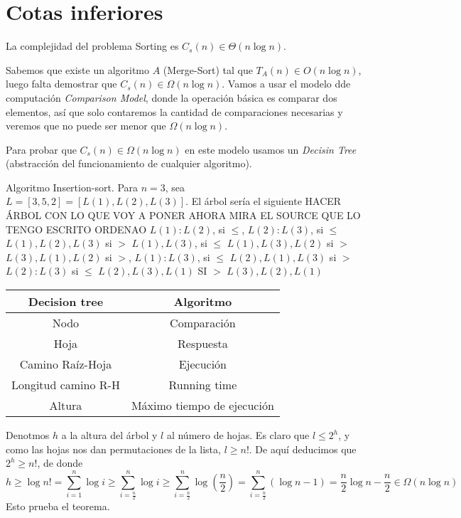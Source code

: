 \documentclass[AL.tex]{subfiles}
\begin{document}
\section{Cotas inferiores}
\begin{teorema}
La complejidad del problema Sorting es $C_s(n)\in\Theta(n\log n)$.
\end{teorema}

Sabemos que existe un algoritmo $A$ (Merge-Sort) tal que $T_A(n)\in O(n\log n)$, luego falta demostrar que $C_s(n)\in\Omega(n\log n)$. Vamos a usar el modelo dde computación \emph{Comparison Model}, donde la operación básica es comparar dos elementos, así que solo contaremos la cantidad de comparaciones necesarias y veremos que no puede ser menor que $\Omega(n\log n)$. 

Para probar que $C_s(n)\in\Omega(n\log n)$ en este modelo usamos un \emph{Decisin Tree} (abstracción del funcionamiento de cualquier algoritmo). 
\begin{ej}
Algoritmo Insertion-sort. Para $n=3$, sea $L=[3,5,2]=[L(1),L(2),L(3)]$. El árbol sería el siguiente
HACER ÁRBOL CON LO QUE VOY A PONER AHORA MIRA EL SOURCE QUE LO TENGO ESCRITO ORDENAO
$L(1):L(2)$, si $\leq$, $L(2):L(3)$, si $\leq$ $L(1),L(2),L(3)$
                                     si $>$ $L(1),L(3)$,        si $\leq$ $L(1),L(3),L(2)$
                                                                si $>$ $L(3),L(1),L(2)$
             si $>$, $L(1):L(3)$, si $\leq$ $L(2),L(1),L(3)$ 
                                     si $>$ $L(2):L(3)$         si $\leq$ $L(2),L(3),L(1)$
             													SI $>$ $L(3),L(2),L(1)$
\end{ej}
\begin{center}
\begin{tabular}{c|c}
Decision tree & Algoritmo\\
\hline
Nodo & Comparación\\
Hoja & Respuesta\\
Camino Raíz-Hoja & Ejecución\\
Longitud camino R-H & Running time\\
Altura & Máximo tiempo de ejecución
\end{tabular}
\end{center}

Denotmos $h$ a la altura del árbol y $l$ al número de hojas. Es claro que $l\leq 2^h$, y como las hojas nos dan permutaciones de la lista, $l\geq n!$. De aquí deducimos que $2^h\geq n!$, de donde 
$$h\geq \log n!=\sum_{i=1}^n\log i\geq \sum_{i=\frac{n}{2}}^n\log i\geq \sum_{i=\frac{n}{2}}^n\log(\frac{n}{2})=\sum_{i=\frac{n}{2}}^n(\log n-1)=\frac{n}{2}\log n-\frac{n}{2}\in\Omega(n\log n)$$
Esto prueba el teorema. 
\end{document}
